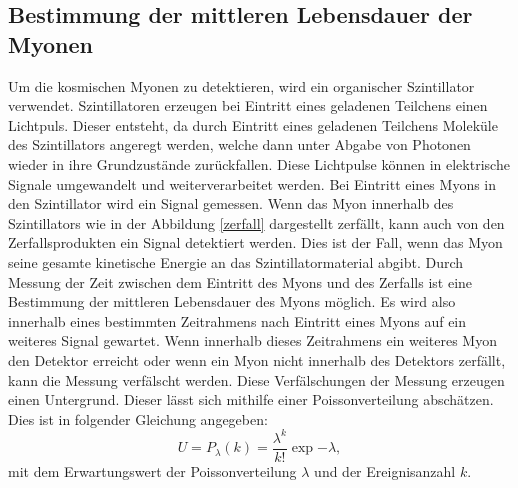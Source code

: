 \subsection{Bestimmung der mittleren Lebensdauer der Myonen}
\label{subsec:BestimmungLebensdauer}
Um die kosmischen Myonen zu detektieren, wird ein organischer Szintillator verwendet.
Szintillatoren erzeugen bei Eintritt eines geladenen Teilchens einen Lichtpuls.
Dieser entsteht, da durch Eintritt eines geladenen Teilchens Moleküle des Szintillators
angeregt werden, welche dann unter Abgabe von Photonen wieder in ihre Grundzustände zurückfallen.
Diese Lichtpulse können in elektrische Signale umgewandelt und weiterverarbeitet werden.
Bei Eintritt eines Myons in den Szintillator wird ein Signal gemessen. Wenn das Myon innerhalb
des Szintillators wie in der Abbildung \ref{zerfall} dargestellt zerfällt, kann auch von den Zerfallsprodukten
ein Signal detektiert werden. Dies ist der Fall, wenn das Myon seine gesamte kinetische Energie
an das Szintillatormaterial abgibt.
Durch Messung der Zeit zwischen dem Eintritt des Myons und des
Zerfalls ist eine Bestimmung der mittleren Lebensdauer des Myons möglich. Es wird also
innerhalb eines bestimmten Zeitrahmens nach Eintritt eines Myons auf ein weiteres Signal
gewartet. Wenn innerhalb dieses Zeitrahmens ein weiteres Myon den Detektor erreicht oder wenn
ein Myon nicht innerhalb des Detektors zerfällt, kann die Messung verfälscht werden.
Diese Verfälschungen der Messung erzeugen einen Untergrund. Dieser lässt sich mithilfe
einer Poissonverteilung abschätzen. Dies ist in folgender Gleichung angegeben:
\begin{equation}
  U = P_{\lambda} (k) = \frac{\lambda^{k}}{k!} \exp{-\lambda},
  \label{eqn:Untergrundrate}
\end{equation}
\noindent
mit dem Erwartungswert der Poissonverteilung $\lambda$ und der Ereignisanzahl $k$.
